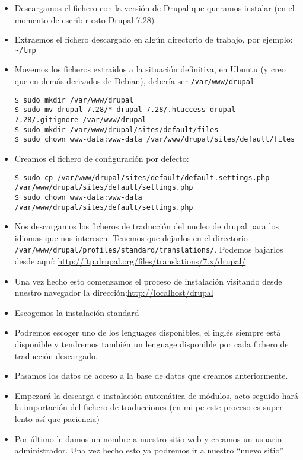 \begin{itemize}
\item
  Descargamos el fichero con la versión de Drupal que queramos instalar
  (en el momento de escribir esto Drupal 7.28)
\item
  Extraemos el fichero descargado en algún directorio de trabajo, por
  ejemplo: \texttt{\textasciitilde{}/tmp}
\item
  Movemos los ficheros extraidos a la situación definitiva, en Ubuntu (y
  creo que en demás derivados de Debian), debería ser
  \texttt{/var/www/drupal}

\begin{verbatim}
$ sudo mkdir /var/www/drupal
$ sudo mv drupal-7.28/* drupal-7.28/.htaccess drupal-7.28/.gitignore /var/www/drupal
$ sudo mkdir /var/www/drupal/sites/default/files
$ sudo chown www-data:www-data /var/www/drupal/sites/default/files
\end{verbatim}
\item
  Creamos el fichero de configuración por defecto:

\begin{verbatim}
$ sudo cp /var/www/drupal/sites/default/default.settings.php /var/www/drupal/sites/default/settings.php
$ sudo chown www-data:www-data /var/www/drupal/sites/default/settings.php
\end{verbatim}
\item
  Nos descargamos los ficheros de traducción del nucleo de drupal para
  los idiomas que nos interesen. Tenemos que dejarlos en el directorio
  \texttt{/var/www/drupal/profiles/standard/translations/}. Podemos
  bajarlos desde aquí:
  \url{http://ftp.drupal.org/files/translations/7.x/drupal/}
\item
  Una vez hecho esto comenzamos el proceso de instalación visitando
  desde nuestro navegador la dirección:\url{http://localhost/drupal}
\item
  Escogemos la instalación standard
\item
  Podremos escoger uno de los lenguages disponibles, el inglés siempre
  está disponible y tendremos también un lenguage disponible por cada
  fichero de traducción descargado.
\item
  Pasamos los datos de acceso a la base de datos que creamos
  anteriormente.
\item
  Empezará la descarga e instalación automática de módulos, acto seguido
  hará la importación del fichero de traducciones (en mi pc este proceso
  es super-lento así que paciencia)
\item
  Por último le damos un nombre a nuestro sitio web y creamos un usuario
  administrador. Una vez hecho esto ya podremos ir a nuestro ``nuevo
  sitio''
\end{itemize}

